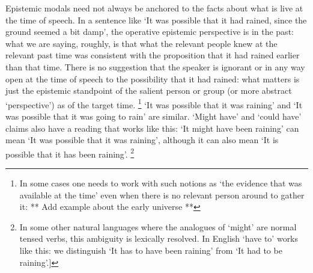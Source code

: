 \documentclass[If.tex]{subfiles}
\begin{document}
Epistemic modals need not always be anchored to the facts about what is live at the time of speech. In a sentence like ‘It was possible that it had rained, since the ground seemed a bit damp’, the operative epistemic perspective is in the past: what we are saying, roughly, is that what the relevant people knew at the relevant past time was consistent with the proposition that it had rained earlier than that time. There is no suggestion that the speaker is ignorant or in any way open at the time of speech to the possibility that it had rained: what matters is just the epistemic standpoint of the salient person or group (or more abstract ‘perspective’) as of the target time.%
\footnote{In some cases one needs to work with such notions as ‘the evidence that was available at the time’ even when there is no relevant person around to gather it: ** Add example about the early universe **}
‘It was possible that it was raining’ and ‘It was possible that it was going to rain’ are similar. ‘Might have’ and ‘could have’ claims also have a reading that works like this: ‘It might have been raining’ can mean ‘It was possible that it was raining’, although it can also mean ‘It is possible that it has been raining’.%
\footnote{In some other natural languages where the analogues of ‘might’ are normal tensed verbs, this ambiguity is lexically resolved. In English ‘have to’ works like this: we distinguish ‘It has to have been raining’ from ‘It had to be raining’.{]}}
\end{document}
